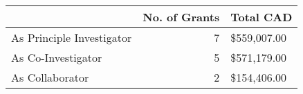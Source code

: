 \begin{tabular}{lrl}
\toprule
 & No. of Grants & Total CAD \\
\midrule
As Principle Investigator & 7 & \$559,007.00 \\
As Co-Investigator & 5 & \$571,179.00 \\
As Collaborator & 2 & \$154,406.00 \\
\bottomrule
\end{tabular}
